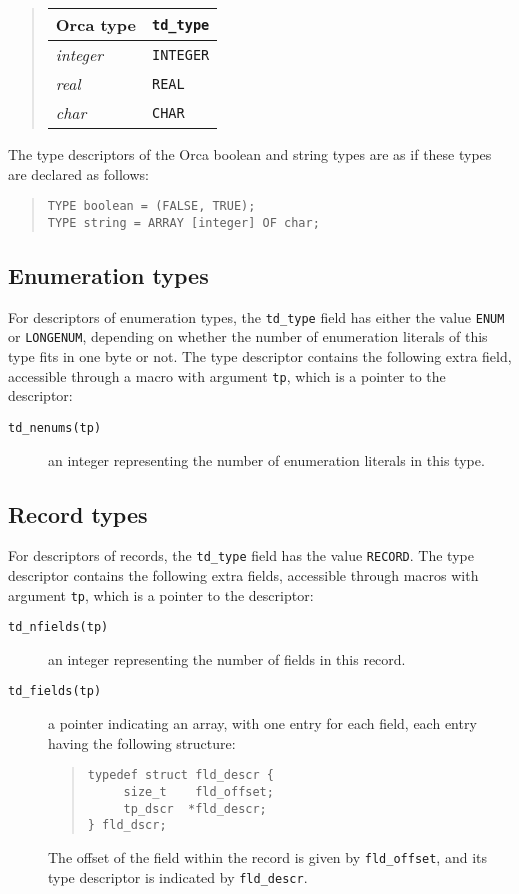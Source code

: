 \documentclass[10pt]{article}
\begin{document}
\begin{quote}
\begin{tabular}{|l|l|}\hline
{\bf Orca type } & \verb+td_type+ \\ \hline
{\em integer} & \verb+INTEGER+ \\
{\em real} & \verb+REAL+ \\
{\em char} & \verb+CHAR+ \\ \hline
\end{tabular}
\end{quote}

The type descriptors of the Orca boolean and string types are as if these
types are declared as follows:
\begin{quote}
\begin{verbatim}
TYPE boolean = (FALSE, TRUE);
TYPE string = ARRAY [integer] OF char;
\end{verbatim}
\end{quote}

\subsection{Enumeration types}
For descriptors of enumeration types, the \verb+td_type+
field has either the value
\verb+ENUM+
or \verb+LONGENUM+, depending on whether the number of
enumeration literals of this type fits in one byte or not.
The type descriptor contains the following extra field, accessible through
a macro with argument \verb+tp+, which is a pointer to the descriptor:
\begin{description}
\item[{\tt td\_nenums(tp)}]
an integer representing the number of enumeration literals in this type.
\end{description}

\subsection{Record types}
For descriptors of records, the \verb+td_type+
field has the value \verb+RECORD+.
The type descriptor contains the following extra fields, accessible through
macros with argument \verb+tp+, which is a pointer to the descriptor:
\begin{description}
\item[{\tt td\_nfields(tp)}]
an integer representing the number of fields in this record.
\item[{\tt td\_fields(tp)}]
a pointer indicating an array, with one entry for each field,
each entry having the following structure:
\begin{quote}
\begin{verbatim}
typedef struct fld_descr {
     size_t    fld_offset;
     tp_dscr  *fld_descr;
} fld_dscr;
\end{verbatim}
\end{quote}
The offset of the field within the record is given by \verb+fld_offset+,
and its type descriptor is indicated by \verb+fld_descr+.
\end{description}
\end{document}
